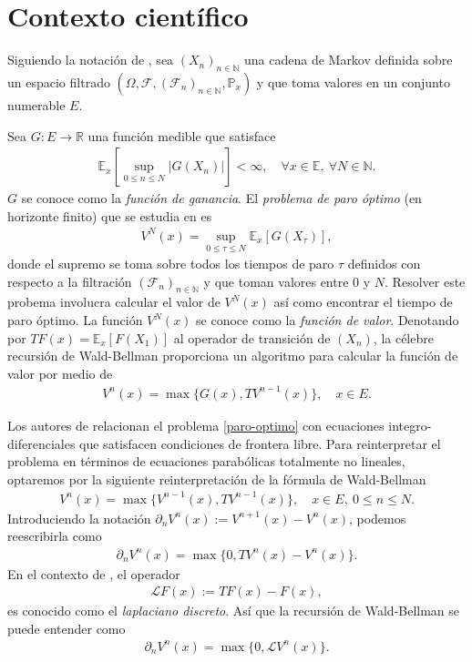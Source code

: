 \documentclass{article}
\numberwithin{equation}{section}
\begin{document}
\section{Contexto científico}


Siguiendo la notación de \cite{peskir2006optimal}, sea $(X_n)_{n\in\mathbb{N}}$ una cadena de Markov definida sobre un espacio filtrado $(\Omega,\mathcal{F},(\mathcal{F}_n)_{n\in \mathbb{N}},\mathbb{P}_x)$ y que toma valores en un conjunto numerable $E$.

Sea $G : E \to \mathbb{R}$ una función medible que satisface 
\begin{align}\label{G-esperanza}
    \mathbb{E}_x\left[\sup_{0\leq n\leq N}|G(X_n)|\right] < \infty, \quad \forall x \in \mathbb{E},\: \forall N \in \mathbb{N}.
\end{align}
$G$ se conoce como la \emph{función de ganancia}. El \emph{problema de paro óptimo} (en horizonte finito) que se estudia en \cite{peskir2006optimal} es
\begin{align}\label{paro-optimo}
    V^N(x) = \sup_{0\leq \tau \leq N}\mathbb{E}_x\left[G(X_\tau)\right],
\end{align}
donde el supremo se toma sobre todos los tiempos de paro $\tau$ definidos con respecto a la filtración $(\mathcal{F}_n)_{n\in\mathbb{N}}$ y que toman valores entre $0$ y $N$. Resolver este probema involucra calcular el valor de $V^N(x)$ así como encontrar el tiempo de paro óptimo. La función $V^N(x)$ se conoce como la \emph{función de valor}. Denotando por $TF(x) = \mathbb{E}_x\left[F(X_1)\right]$ al operador de transición de $(X_n)$, la célebre recursión de Wald-Bellman proporciona un algoritmo para calcular la función de valor por medio de
\begin{align}\label{wb}
    V^n(x) = \max\{G(x), TV^{n-1}(x)\}, \quad x \in E.
\end{align}

Los autores de \cite{peskir2006optimal} relacionan el problema \eqref{paro-optimo} con ecuaciones integro-diferenciales que satisfacen condiciones de frontera libre. Para reinterpretar el problema en términos de ecuaciones parabólicas totalmente no lineales, optaremos por la siguiente reinterpretación de la fórmula de Wald-Bellman
\begin{align}\label{nueva-recurrencia}
        V^n(x) = \max\{V^{n-1}(x), TV^{n-1}(x)\}, \quad x \in E, \: 0\leq n\leq N.
    \end{align}
Introduciendo la notación $\partial_nV^n(x) := V^{n+1}(x)-V^n(x)$, podemos reescribirla como
\begin{align}\label{no-lineal}
    \partial_nV^n(x) = \max\{0, TV^{n}(x)-V^{n}(x)\}.
\end{align}
En el contexto de \cite{lawler2010random}, el operador
\begin{align*}
   \mathcal{L}F(x) := TF(x)-F(x),
\end{align*}
es conocido como el \emph{laplaciano discreto}. Así que la recursión de Wald-Bellman se puede entender como
\begin{align}\label{discreto}
    \partial_nV^n(x) = \max\{0, \mathcal{L}V^{n}(x)\}.
\end{align}
\end{document}
